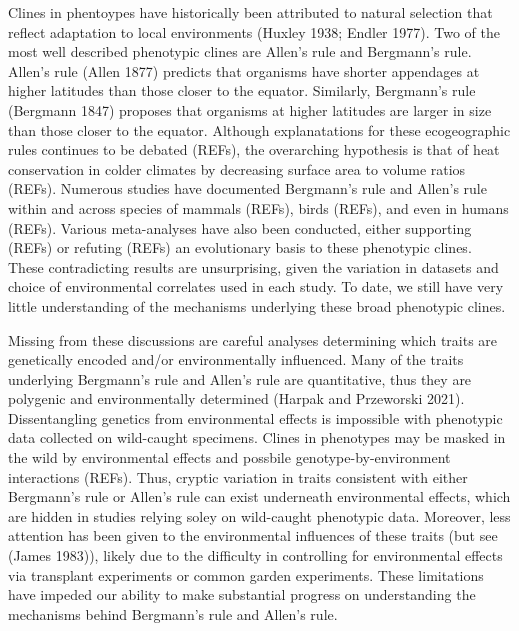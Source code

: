 \documentclass[]{article}
\begin{document}
Clines in phentoypes have historically been attributed to natural
selection that reflect adaptation to local environments (Huxley 1938;
Endler 1977). Two of the most well described phenotypic clines are
Allen's rule and Bergmann's rule. Allen's rule (Allen 1877) predicts
that organisms have shorter appendages at higher latitudes than those
closer to the equator. Similarly, Bergmann's rule (Bergmann 1847)
proposes that organisms at higher latitudes are larger in size than
those closer to the equator. Although explanatations for these
ecogeographic rules continues to be debated (REFs), the overarching
hypothesis is that of heat conservation in colder climates by decreasing
surface area to volume ratios (REFs). Numerous studies have documented
Bergmann's rule and Allen's rule within and across species of mammals
(REFs), birds (REFs), and even in humans (REFs). Various meta-analyses
have also been conducted, either supporting (REFs) or refuting (REFs) an
evolutionary basis to these phenotypic clines. These contradicting
results are unsurprising, given the variation in datasets and choice of
environmental correlates used in each study. To date, we still have very
little understanding of the mechanisms underlying these broad phenotypic
clines.

Missing from these discussions are careful analyses determining which
traits are genetically encoded and/or environmentally influenced. Many
of the traits underlying Bergmann's rule and Allen's rule are
quantitative, thus they are polygenic and environmentally determined
(Harpak and Przeworski 2021). Dissentangling genetics from environmental
effects is impossible with phenotypic data collected on wild-caught
specimens. Clines in phenotypes may be masked in the wild by
environmental effects and possbile genotype-by-environment interactions
(REFs). Thus, cryptic variation in traits consistent with either
Bergmann's rule or Allen's rule can exist underneath environmental
effects, which are hidden in studies relying soley on wild-caught
phenotypic data. Moreover, less attention has been given to the
environmental influences of these traits (but see (James 1983)), likely
due to the difficulty in controlling for environmental effects via
transplant experiments or common garden experiments. These limitations
have impeded our ability to make substantial progress on understanding
the mechanisms behind Bergmann's rule and Allen's rule.
\end{document}

